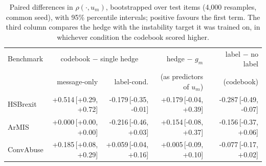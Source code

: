 \begin{table}[t]
\centering
\small
\begin{tabular}{lrrrr}
\hline
Benchmark & \multicolumn{2}{c}{codebook $-$ single hedge} & hedge $-$ $g_m$ & label $-$ no label \\
 & message-only & label-cond. & (as predictors of $u_m$) & (codebook) \\
\hline
HSBrexit & +0.514{\scriptsize\,[+0.29, +0.72]} & -0.179{\scriptsize\,[-0.35, -0.01]} & +0.179{\scriptsize\,[-0.04, +0.39]} & -0.287{\scriptsize\,[-0.49, -0.07]} \\
ArMIS & +0.000{\scriptsize\,[+0.00, +0.00]} & -0.216{\scriptsize\,[-0.46, +0.03]} & +0.154{\scriptsize\,[-0.08, +0.37]} & -0.156{\scriptsize\,[-0.37, +0.06]} \\
ConvAbuse & +0.185{\scriptsize\,[+0.08, +0.29]} & +0.059{\scriptsize\,[-0.04, +0.16]} & +0.005{\scriptsize\,[-0.09, +0.10]} & -0.077{\scriptsize\,[-0.17, +0.02]} \\
\hline
\end{tabular}
\caption{Paired differences in $\rho(\cdot,u_m)$, bootstrapped over test items (4,000 resamples, common seed), with 95\% percentile intervals; positive favours the first term. The third column compares the hedge with the instability target it was trained on, in whichever condition the codebook scored higher.}
\label{tab:paired}
\end{table}